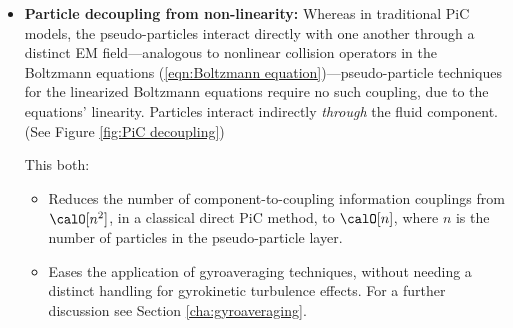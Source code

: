     \begin{itemize}
        \item  {\bf Particle decoupling from non-linearity:} Whereas in traditional PiC models, the pseudo-particles interact directly with one another through a distinct EM field---analogous to nonlinear collision operators in the Boltzmann equations (\ref{eqn:Boltzmann equation})---pseudo-particle techniques for the linearized Boltzmann equations require no such coupling, due to the equations' linearity. Particles interact indirectly \emph{through} the fluid component. (See Figure \ref{fig:PiC decoupling})

        This both:
        \begin{itemize}
            \item  Reduces the number of component-to-coupling information couplings from $\calO[n^{2}]$, in a classical direct PiC method, to $\calO[n]$, where $n$ is the number of particles in the pseudo-particle layer.
            \item  Eases the application of gyroaveraging techniques, without needing a distinct handling for gyrokinetic turbulence effects. For a further discussion see Section \ref{cha:gyroaveraging}.
        \end{itemize}

        
        \begin{figure}[!ht]
            \centering
            \begin{subfigure}{0.5\textwidth}
                \centering
\end{subfigure}
\end{figure}
\end{itemize}
